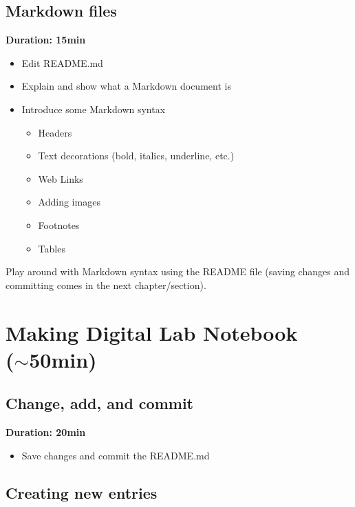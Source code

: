 \documentclass[a4paper, 12pt, oneside]{report} %
\begin{document}
\section{Markdown files}
\label{sec:markdown_files}

{\bfseries Duration: 15min}

\begin{itemize}
	\item Edit README.md
	\item Explain and show what a Markdown document is
	\item Introduce some Markdown syntax
		\begin{itemize}
			\item Headers
			\item Text decorations (bold, italics, underline, etc.)
			\item Web Links
			\item Adding images
			\item Footnotes
			\item Tables
		\end{itemize}
\end{itemize}

\noindent
Play around with Markdown syntax using the README file (saving changes and committing comes in the next chapter/section).


\chapter{Making Digital Lab Notebook\\($\sim$50min)}
\label{cha:making_digital_lab_notebook}

\section{Change, add, and commit}
\label{sec:change_add_and_commit}

{\bfseries Duration: 20min}

\begin{itemize}
	\item Save changes and commit the README.md
\end{itemize}



\section{Creating new entries}
\label{sec:creating_new_entries}
\end{document}
